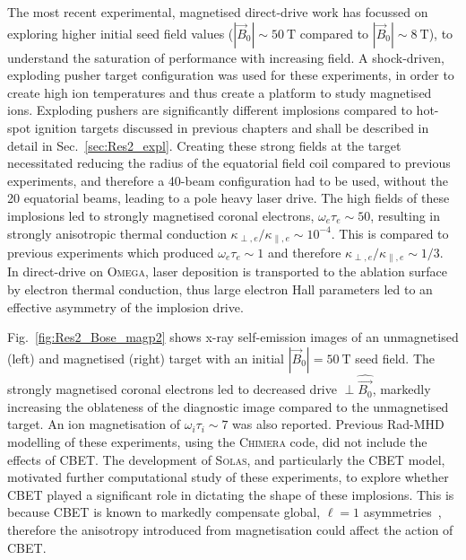The most recent experimental, magnetised direct-drive work has focussed on exploring higher initial seed field values ($|\vec{B}_0|\sim50\ \text{T}$ compared to $|\vec{B}_0|\sim8\ \text{T}$), to understand the saturation of performance with increasing field.
A shock-driven, exploding pusher target configuration was used for these experiments, in order to create high ion temperatures and thus create a platform to study magnetised ions.
Exploding pushers are significantly different implosions compared to hot-spot ignition targets discussed in previous chapters and shall be described in detail in Sec.~\ref{sec:Res2_expl}.
Creating these strong fields at the target necessitated reducing the radius of the equatorial field coil compared to previous experiments, and therefore a 40-beam configuration had to be used, without the 20 equatorial beams, leading to a pole heavy laser drive.
The high fields of these implosions led to strongly magnetised coronal electrons, $\omega_e\tau_e\sim50$, resulting in strongly anisotropic thermal conduction $\kappa_{\perp,e}/\kappa_{\parallel,e}\sim10^{-4}$.
This is compared to previous experiments which produced $\omega_e\tau_e\sim1$ and therefore $\kappa_{\perp,e}/\kappa_{\parallel,e}\sim1/3$.
In direct-drive on \textsc{Omega}, laser deposition is transported to the ablation surface by electron thermal conduction, thus large electron Hall parameters led to an effective asymmetry of the implosion drive.

Fig.~\ref{fig:Res2_Bose_magp2} shows x-ray self-emission images of an unmagnetised (left) and magnetised (right) target with an initial $|\vec{B}_0|=50\ \text{T}$ seed field.
The strongly magnetised coronal electrons led to decreased drive $\perp\hat{\vec{B_0}}$, markedly increasing the oblateness of the diagnostic image compared to the unmagnetised target.
An ion magnetisation of $\omega_i\tau_i\sim7$ was also reported.
Previous \ac{Rad-MHD} modelling of these experiments, using the \textsc{Chimera} code, did not include the effects of \ac{CBET}.
The development of \textsc{Solas}, and particularly the \ac{CBET} model, motivated further computational study of these experiments, to explore whether \ac{CBET} played a significant role in dictating the shape of these implosions.
This is because \ac{CBET} is known to markedly compensate global, $\ell=1$ asymmetries~\cite{anderson_effect_2020,colaitis_inverse_2021}, therefore the anisotropy introduced from magnetisation could affect the action of \ac{CBET}.

